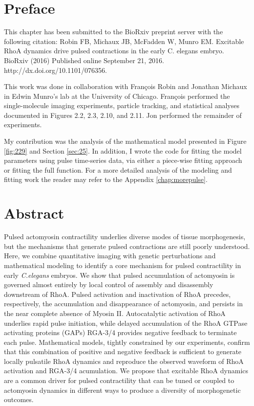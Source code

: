 
\section{Preface}
This chapter has been submitted to the BioRxiv preprint server with the following citation: Robin FB, Michaux JB, McFadden W, Munro EM.  Excitable RhoA dynamics drive pulsed contractions in the early C. elegans embryo.  BioRxiv (2016) Published online September 21, 2016. http://dx.doi.org/10.1101/076356.


This work was done in collaboration with Fran\c{c}ois Robin and Jonathan Michaux in Edwin Munro's lab at the University of Chicago.  Fran\c{c}ois performed the single-molecule imaging experiments, particle tracking, and statistical analyses documented in Figures 2.2, 2.3, 2.10, and 2.11.  Jon performed the remainder of experiments.  

My contribution was the analysis of the mathematical model presented in Figure \ref{fig:229} and Section \ref{sec:25}.  In addition, I wrote the code for fitting the model parameters using pulse time-series data, via either a piece-wise fitting approach or fitting the full function.  For a more detailed analysis of the modeling and fitting work the reader may refer to the Appendix \ref{chap:morepulse}.

\section{Abstract}
Pulsed actomyosin contractility underlies diverse modes of tissue morphogenesis, but the mechanisms that generate pulsed contractions are still poorly understood.  Here, we combine quantitative imaging with genetic perturbations and mathematical modeling to identify a core mechanism for pulsed contractility in early \textit{C.elegans} embryos.  We show that pulsed accumulation of actomyosin is governed almost entirely by local control of assembly and disassembly downstream of RhoA.  Pulsed activation and inactivation of RhoA precedes, respectively, the accumulation and disappearance of actomyosin, and persists in the near complete absence of Myosin II.  Autocatalytic activation of RhoA underlies rapid pulse initiation, while delayed accumulation of the RhoA GTPase activating proteins (GAPs) RGA-3/4 provides negative feedback to terminate each pulse. Mathematical models, tightly constrained by our experiments, confirm that this combination of positive and negative feedback is sufficient to generate locally pulsatile RhoA dynamics and reproduce the observed waveform of RhoA activation and RGA-3/4 acumulation. We propose that excitable RhoA dynamics are a common driver for pulsed contractility that can be tuned or coupled to actomyosin dynamics in different ways to produce a diversity of morphogenetic outcomes.


